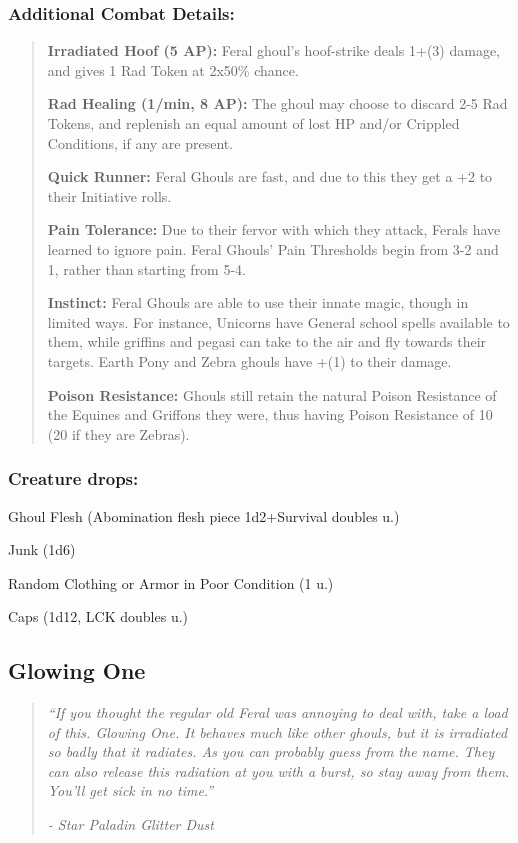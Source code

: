 \documentclass[11pt,a4paper,twocolumn]{book}
\begin{document}
	\subsubsection*{Additional Combat Details:}
	\begin{verse}
		\textbf{Irradiated Hoof (5 AP):} Feral ghoul's hoof-strike deals 1+(3) damage, and gives 1 Rad Token at 2x50\% chance.
		
		\textbf{Rad Healing (1/min, 8 AP):} The ghoul may choose to discard 2-5 Rad Tokens, and replenish an equal amount of lost HP and/or Crippled Conditions, if any are present.
		
		\textbf{Quick Runner:} Feral Ghouls are fast, and due to this they get a +2 to their Initiative rolls.
		
		\textbf{Pain Tolerance:} Due to their fervor with which they attack, Ferals have learned to ignore pain. Feral Ghouls' Pain Thresholds begin from 3-2 and 1, rather than starting from 5-4.
		
		\textbf{Instinct:} Feral Ghouls are able to use their innate magic, though in limited ways. For instance, Unicorns have General school spells available to them, while griffins and pegasi can take to the air and fly towards their targets. Earth Pony and Zebra ghouls have +(1) to their damage. 
		
		\textbf{Poison Resistance:} Ghouls still retain the natural Poison Resistance of the Equines and Griffons they were, thus having Poison Resistance of 10 (20 if they are Zebras). 
	\end{verse}
	
	\subsubsection*{Creature drops:}
	\begin{compactitem}
		\item Ghoul Flesh (Abomination flesh piece 1d2+Survival doubles u.)
		\item Junk (1d6)
		\item Random Clothing or Armor in Poor Condition (1 u.)
		\item Caps (1d12, LCK doubles u.)
	\end{compactitem}
	
	\subsection*{Glowing One}
	\begin{quote}
		\emph{``If you thought the regular old Feral was annoying to deal with, take a load of this. Glowing One. It behaves much like other ghouls, but it is irradiated so badly that it radiates. As you can probably guess from the name. They can also release this radiation at you with a burst, so stay away from them. You'll get sick in no time.''}
		
		\emph{-	Star Paladin Glitter Dust}
	\end{quote}
	
\end{document}
